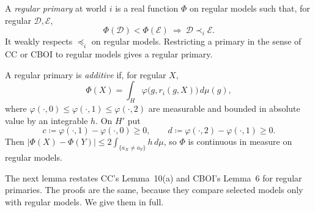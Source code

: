 \documentclass[11pt]{article}
\theoremstyle{remark}\newtheorem{remark}[theorem]{Remark}
\newcommand{\Dscr}{\mathcal D}
\newcommand{\Escr}{\mathcal E}
\begin{document}
A \emph{regular primary} at world $i$ is a real function $\Phi$ on regular
models such that, for regular $\Dscr,\Escr$,
\[
 \Phi(\Dscr)<\Phi(\Escr)\ \Longrightarrow\ \Dscr\prec_i\Escr.
\]
It weakly respects $\preceq_i$ on regular models. Restricting a primary in
the sense of CC or CBOI to regular models gives a regular primary.

A regular primary is \emph{additive} if, for regular $X$,
\[
 \Phi(X)=\int_H\varphi\bigl(g,r_i(g,X)\bigr)\,d\mu(g),
\]
where $\varphi(\cdot,0)\le\varphi(\cdot,1)\le\varphi(\cdot,2)$ are measurable
and bounded in absolute value by an integrable $h$. On $H'$ put
\[
 c\coloneqq\varphi(\cdot,1)-\varphi(\cdot,0)\ge0,\qquad
 d\coloneqq\varphi(\cdot,2)-\varphi(\cdot,1)\ge0.
\]
Then $|\Phi(X)-\Phi(Y)|\le2\int_{\{a_X\ne a_Y\}}h\,d\mu$, so $\Phi$ is
continuous in measure on regular models.

The next lemma restates CC's Lemma~10(a) and CBOI's Lemma~6 for regular
primaries. The proofs are the same, because they compare selected models
only with regular models. We give them in full.
\end{document}
